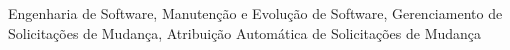 \lipsum[1-4]

\begin{keywords}
Engenharia de Software, Manutenção e Evolução de Software, Gerenciamento de
Solicitações de Mudança, Atribuição Automática de Solicitações de Mudança
\end{keywords}
